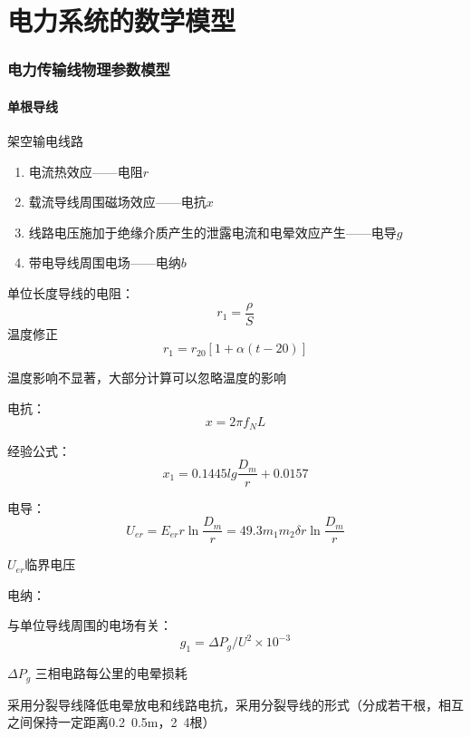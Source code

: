 \documentclass[10pt]{ctexart}
\begin{document}
\part{电力系统的数学模型}
\section{电力传输线物理参数模型}
\subsection{单根导线}
\begin{margintable}
    {\color{red}架空输电线路}
\end{margintable}
\begin{remark}

    \begin{enumerate}

        \item 电流热效应——电阻$ r $ 
        \item 载流导线周围磁场效应——电抗$ x $ 
        \item 线路电压施加于绝缘介质产生的泄露电流和电晕效应产生——电导$ g $ 
        \item 带电导线周围电场——电纳$ b $ 
    \end{enumerate}
\end{remark}
\begin{definition}
    单位长度导线的电阻：$$	r _{1} =\frac{\rho}{S}$$ 
    温度修正$$	r_{1} =r_{20} [1+\alpha(t-20)]$$ 
\end{definition}
\begin{margintable}
    温度影响不显著，大部分计算可以忽略温度的影响
\end{margintable}
\begin{definition}
    电抗：$$	x=2\pi f_{N} L$$ 
\end{definition}
\begin{lemma}
    经验公式：
    $$	x_{1} =0.1445 lg \frac{D_{m} }{r}+0.0157$$ 
\end{lemma}
\begin{definition}
    电导：
    $$	U_{er} =E_{er} r\ln \frac{D_{m} }{r}=49.3m_{1} m_{2} \delta r \ln \frac{D_{m} }{r}$$ 
\end{definition}
\begin{margintable}
    $ U_{er}  $临界电压 
\end{margintable}
\begin{definition}
    电纳：

    与单位导线周围的电场有关：
    $$	g_{1} =\Delta P_{g} /U^{2} \times 10^{-3} $$ 
\end{definition}
\begin{margintable}
    $ \Delta P_{g}  $ 三相电路每公里的电晕损耗
\end{margintable}
采用分裂导线降低电晕放电和线路电抗，采用分裂导线的形式（分成若干根，相互之间保持一定距离0.2~0.5m，2~4根）\\
\end{document}
